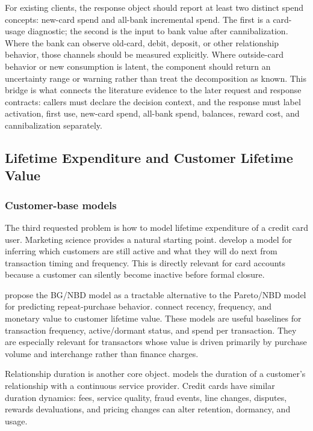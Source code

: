\documentclass[11pt]{article}
\newcommand{\1}{\mathbf{1}}
\begin{document}
For existing clients, the response object should report at least two distinct
spend concepts: new-card spend and all-bank incremental spend. The first is a
card-usage diagnostic; the second is the input to bank value after
cannibalization. Where the bank can observe old-card, debit, deposit, or other
relationship behavior, those channels should be measured explicitly. Where
outside-card behavior or new consumption is latent, the component should return
an uncertainty range or warning rather than treat the decomposition as known.
This bridge is what connects the literature evidence to the later request and
response contracts: callers must declare the decision context, and the response
must label activation, first use, new-card spend, all-bank spend, balances,
reward cost, and cannibalization separately.

\subsection{Lifetime Expenditure and Customer Lifetime Value}
\label{sec:ltv}

\subsubsection{Customer-base models}

The third requested problem is how to model lifetime expenditure of a credit
card user. Marketing science provides a natural starting point. \citet{schmittlein1987counting}
develop a model for inferring which customers are still active and what they
will do next from transaction timing and frequency. This is directly relevant
for card accounts because a customer can silently become inactive before formal
closure.

\citet{fader2005bgnbd} propose the BG/NBD model as a tractable alternative to
the Pareto/NBD model for predicting repeat-purchase behavior.
\citet{fader2005rfm} connect recency, frequency, and monetary value to customer
lifetime value. These models are useful baselines for transaction frequency,
active/dormant status, and spend per transaction. They are especially relevant
for transactors whose value is driven primarily by purchase volume and
interchange rather than finance charges.

Relationship duration is another core object. \citet{bolton1998duration} models
the duration of a customer's relationship with a continuous service provider.
Credit cards have similar duration dynamics: fees, service quality, fraud
events, line changes, disputes, rewards devaluations, and pricing changes can
alter retention, dormancy, and usage.
\end{document}
